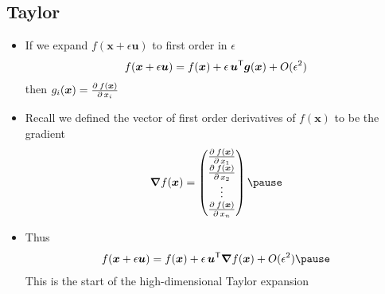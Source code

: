 
\begin{slide}
\section[-2]{Taylor}

\begin{PauseHighLight}
  \begin{itemize}
  \item If we expand $f(\bm{x}+ \epsilon \bm{u})$ to first order in $\epsilon$
    \begin{align*}
      f(\bm{x}+ \epsilon \bm{u})  = f(\bm{x})  + \epsilon \,
      \bm{u}^{\textsf{T}} \bm{g}(\bm{x}) + O(\epsilon^2)
    \end{align*}
    then $g_i(\bm{x}) = \frac{\partial^{\,}{f(\bm{x})}}{\partial\,{x_i}}$\pause
  \item Recall we defined the vector of first order derivatives of
    $f(\bm{x})$ to be the gradient
  \vspace{-1cm}
    {\small
    \begin{align*}
      \grad f(\bm{x})  =
      \begin{pmatrix}
        \pd{f(\bm{x})}{x_1} \\ \pd{f(\bm{x})}{x_2}  \\ \vdots \\ \pd{f(\bm{x})}{x_n} 
      \end{pmatrix}\pause
    \end{align*}}
  \vspace{-3cm}
  
  \item Thus
     \begin{align*}
      f(\bm{x}+ \epsilon \bm{u})  = f(\bm{x})  + \epsilon \,
      \bm{u}^\tr \grad f(\bm{x})  + O(\epsilon^2)\pause
     \end{align*}
     This is the start of the high-dimensional Taylor expansion\pauseb
  \end{itemize}
\end{PauseHighLight}

\end{slide}


